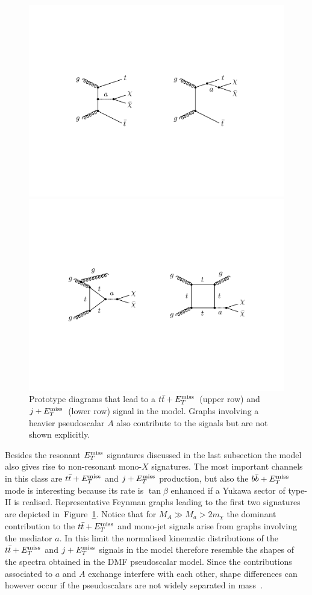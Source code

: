 \begin{figure}[t!]
\centering
\includegraphics[width=.725\textwidth]{texinputs/04_grid/newfigures/ttmet.pdf}

\vspace{7mm}

\includegraphics[width=.8\textwidth]{texinputs/04_grid/newfigures/jmet.pdf}

\vspace{4mm}
\caption{\label{fig:nonresonant} Prototype diagrams that lead  to a $t \bar t+E_T^\mathrm{miss}$~(upper row) and $j+E_T^\mathrm{miss}$~(lower row) signal in the \hdma model. Graphs involving a heavier pseudoscalar $A$ also contribute to the signals but are not shown explicitly.}
\end{figure}

Besides the resonant $E_T^\mathrm{miss}$ signatures discussed in the last subsection the   \hdma model also gives rise to non-resonant mono-$X$ signatures. The most important channels in this class are $t \bar t +E_T^\mathrm{miss}$ and $j+E_T^\mathrm{miss}$ production, but also  the $b \bar b +E_T^\mathrm{miss}$ mode is interesting  because its rate is $\tan \beta$ enhanced if a Yukawa sector of  type-II is realised.  Representative Feynman graphs leading to the first two signatures are depicted in~Figure~\ref{fig:nonresonant}. Notice that for $M_A \gg M_a > 2 m_\chi$ the dominant contribution to the  $t \bar t +E_T^\mathrm{miss}$ and mono-jet signals arise from graphs involving the  mediator $a$. In this limit the normalised kinematic distributions of the $t \bar t + E_T^\mathrm{miss}$ and $j+E_T^\mathrm{miss}$ signals in the \hdma model therefore resemble the shapes of the spectra obtained in the DMF pseudoscalar   model. Since the contributions  associated to $a$ and $A$ exchange interfere with each other, shape differences can however occur if the pseudoscalars are not widely separated in mass~\cite{Bauer:2017ota}.

